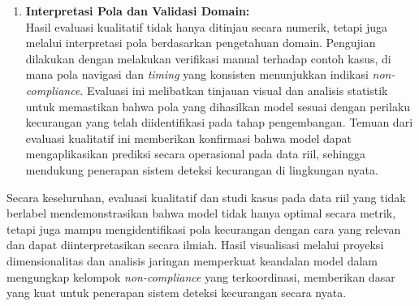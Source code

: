 \begin{enumerate}
    \item \textbf{Interpretasi Pola dan Validasi Domain:} \\
    Hasil evaluasi kualitatif tidak hanya ditinjau secara numerik, tetapi juga melalui interpretasi pola berdasarkan pengetahuan domain. Pengujian dilakukan dengan melakukan verifikasi manual terhadap contoh kasus, di mana pola navigasi dan \textit{timing} yang konsisten menunjukkan indikasi \textit{non-compliance}. Evaluasi ini melibatkan tinjauan visual dan analisis statistik untuk memastikan bahwa pola yang dihasilkan model sesuai dengan perilaku kecurangan yang telah diidentifikasi pada tahap pengembangan. Temuan dari evaluasi kualitatif ini memberikan konfirmasi bahwa model dapat mengaplikasikan prediksi secara operasional pada data riil, sehingga mendukung penerapan sistem deteksi kecurangan di lingkungan nyata.
\end{enumerate}

Secara keseluruhan, evaluasi kualitatif dan studi kasus pada data riil yang tidak berlabel mendemonstrasikan bahwa model tidak hanya optimal secara metrik, tetapi juga mampu mengidentifikasi pola kecurangan dengan cara yang relevan dan dapat diinterpretasikan secara ilmiah. Hasil visualisasi melalui proyeksi dimensionalitas dan analisis jaringan memperkuat keandalan model dalam mengungkap kelompok \textit{non-compliance} yang terkoordinasi, memberikan dasar yang kuat untuk penerapan sistem deteksi kecurangan secara nyata.


